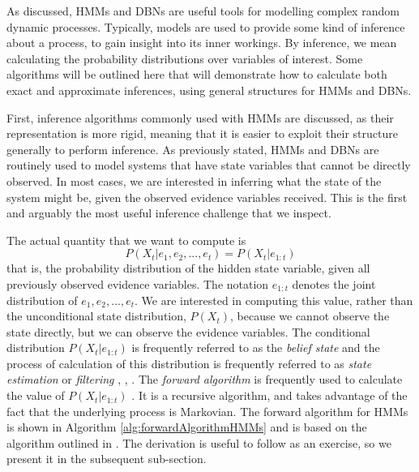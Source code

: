 As discussed, HMMs and DBNs are useful tools for modelling complex random dynamic processes. Typically, models are used to provide some kind of inference about a process, to gain insight into its inner workings. By inference, we mean calculating the probability distributions over variables of interest. Some algorithms will be outlined here that will demonstrate how to calculate both exact and approximate inferences, using general structures for HMMs and DBNs. \par

First, inference algorithms commonly used with HMMs are discussed, as their representation is more rigid, meaning that it is easier to exploit their structure generally to perform inference. As previously stated, HMMs and DBNs are routinely used to model systems that have state variables that cannot be directly observed. In most cases, we are interested in inferring what the state of the system might be, given the observed evidence variables received. This is the first and arguably the most useful inference challenge that we inspect.

The actual quantity that we want to compute is 
\[P(X_t | e_1, e_2, ..., e_t) = P(X_t | e_{1:t})\]
that is, the probability distribution of the hidden state variable, given all previously observed evidence variables. The notation $e_{1:t}$ denotes the joint distribution of $e_1, e_2, ..., e_t$. We are interested in computing this value, rather than the unconditional state distribution, $P(X_t)$, because we cannot observe the state directly, but we can observe the evidence variables. The conditional distribution $P(X_t | e_{1:t})$ is frequently referred to as the \textit{belief state} and the process of calculation of this distribution is frequently referred to as \textit{state estimation} or \textit{filtering} \cite{AIAMA}, \cite{Thrun:2005:ProbabilisticRobotics}, \cite{KollerPGM}. The \textit{forward algorithm} is frequently used to calculate the value of $P(X_t | e_{1:t})$ \cite[p.~572]{AIAMA}. It is a recursive algorithm, and takes advantage of the fact that the underlying process is Markovian. The forward algorithm for HMMs is shown in Algorithm \ref{alg:forwardAlgorithmHMMs} and is based on the algorithm outlined in \cite[p~.27]{Thrun:2005:ProbabilisticRobotics}. The derivation is useful to follow as an exercise, so we present it in the subsequent sub-section.
